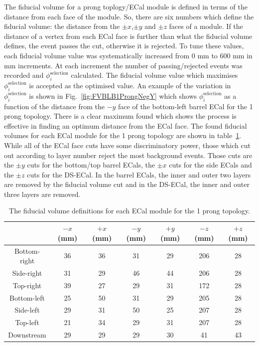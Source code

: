 The fiducial volume for a prong toplogy/ECal module is defined in terms of the distance from each face of the module.  So, there are six numbers which define the fiducial volume:  the distance from the $\pm x$,$\pm y$ and $\pm z$ faces of a module.  If the distance of a vertex from each ECal face is further than what the fiducial volume defines, the event passes the cut, otherwise it is rejected.  To tune these values,  each fiducial volume value was systematically increased from 0 mm to 600 mm in mm increments.  At each increment the number of passing/rejected events was recorded and $\phi_i^{\textrm{selection}}$ calculated.  The fiducial volume value which maximises $\phi_i^{\textrm{selection}}$ is accepted as the optimised value.  An example of the variation in $\phi_i^{\textrm{selection}}$ is shown in Fig.~\ref{fig:FVBLB1ProngNegY} which shows $\phi_i^{\textrm{selection}}$ as a function of the distance from the $-y$ face of the bottom-left barrel ECal for the 1 prong topology.  There is a clear maximum found which shows the process is effective in finding an optimum distance from the ECal face.
\newline
\newline
The found fiducial volumes for each ECal module for the 1 prong topology are shown in table~\ref{table:FV1Prong}.  While all of the ECal face cuts have some discriminatory power, those which cut out according to layer number reject the most background events.  Those cuts are the $\pm y$ cuts for the bottom/top barrel ECals, the $\pm x$ cuts for the side ECals and the $\pm z$ cuts for the DS-ECal.  In the barrel ECals, the inner and outer two layers are removed by the fiducial volume cut and in the DS-ECal, the inner and outer three layers are removed.
\begin{table}
  \begin{tabular}{ c c c c c c c }
     & $-x$ (mm) & $+x$ (mm) & $-y$ (mm) & $+y$ (mm) & $-z$ (mm) & $+z$ (mm)  \\ \hline \hline
    Bottom-right & 36 & 36 & 31 & 29 & 206 & 28 \\
    Side-right & 31 & 29 & 46 & 44 & 206 & 28 \\
    Top-right & 39 & 27 & 29 & 31 & 172 & 28 \\
    Bottom-left & 25 & 50 & 31 & 29 & 205 & 28 \\
    Side-left & 29 & 31 & 50 & 25 & 207 & 28 \\
    Top-left & 21 & 34 & 29 & 31 & 207 & 28 \\
    Downstream & 29 & 29 & 29 & 30 & 41 & 43  \\
  \end{tabular}
  \caption{The fiducial volume definitions for each ECal module for the 1 prong topology.}
  \label{table:FV1Prong}
\end{table}
